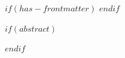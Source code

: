 $if(has-frontmatter)$
\frontmatter
$endif$



$if(abstract)$
\begin{abstract}
$abstract$
\end{abstract}
$endif$
